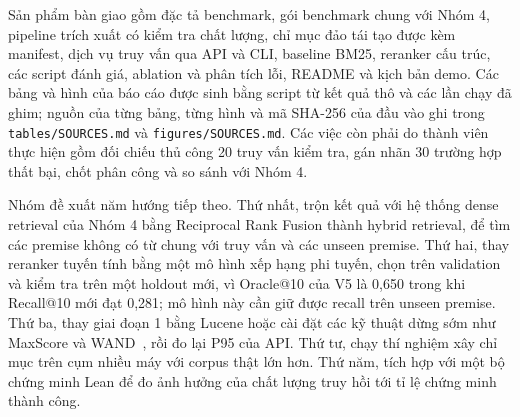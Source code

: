 \documentclass[11pt,a4paper,oneside]{report}
\newcommand{\code}[1]{\texttt{#1}}
\begin{document}
Sản phẩm bàn giao gồm đặc tả benchmark, gói benchmark chung với Nhóm 4, pipeline trích xuất có kiểm tra chất lượng, chỉ mục đảo tái tạo được kèm manifest,
dịch vụ truy vấn qua API và CLI, baseline BM25, reranker cấu trúc, các script đánh giá, ablation và phân tích lỗi, README
và kịch bản demo. Các bảng và hình của báo cáo được sinh bằng script từ kết quả thô và các lần chạy đã ghim; nguồn của
từng bảng, từng hình và mã SHA-256 của đầu vào ghi trong \code{tables/SOURCES.md} và \code{figures/SOURCES.md}. Các việc còn phải do thành viên thực
hiện gồm đối chiếu thủ công 20 truy vấn kiểm tra, gán nhãn 30 trường hợp thất bại, chốt phân công và so sánh với Nhóm 4.

Nhóm đề xuất năm hướng tiếp theo. Thứ nhất, trộn kết quả với hệ thống dense retrieval của Nhóm 4 bằng Reciprocal Rank Fusion
thành hybrid retrieval, để tìm các premise không có từ chung với truy vấn và các unseen premise. Thứ hai, thay reranker tuyến tính bằng một mô hình xếp
hạng phi tuyến, chọn trên validation và kiểm tra trên một holdout mới, vì Oracle@10 của V5 là 0,650 trong khi Recall@10 mới
đạt 0,281; mô hình này cần giữ được recall trên unseen premise. Thứ ba, thay giai đoạn 1 bằng Lucene hoặc cài đặt các
kỹ thuật dừng sớm như MaxScore và WAND~\cite{broder2003}, rồi đo lại P95 của API. Thứ tư, chạy thí nghiệm xây chỉ mục trên
cụm nhiều máy với corpus thật lớn hơn. Thứ năm, tích hợp với một bộ chứng minh Lean để đo ảnh hưởng của chất lượng truy hồi
tới tỉ lệ chứng minh thành công.
\end{document}
